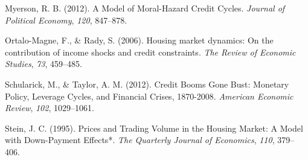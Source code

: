 \documentclass[
  12pt,
]{article}
\newlength{\cslhangindent}
\newlength{\cslentryspacingunit} %
\newenvironment{CSLReferences}[2] %
 {%
  \setlength{\parindent}{0pt}
  \ifodd #1
  \let\oldpar\par
  \def\par{\hangindent=\cslhangindent\oldpar}
  \fi
  \setlength{\parskip}{#2\cslentryspacingunit}
 }%
 {}
\begin{document}
\begin{CSLReferences}{1}{0}
\leavevmode{}%
Myerson, R. B. (2012). A {Model} of {Moral}-{Hazard Credit Cycles}. \emph{Journal of Political Economy}, \emph{120}, 847--878.

\leavevmode{}%
Ortalo-Magne, F., \& Rady, S. (2006). Housing market dynamics: On the contribution of income shocks and credit constraints. \emph{The Review of Economic Studies}, \emph{73}, 459--485.

\leavevmode{}%
Schularick, M., \& Taylor, A. M. (2012). Credit {Booms Gone Bust}: Monetary {Policy}, {Leverage Cycles}, and {Financial Crises}, 1870-2008. \emph{American Economic Review}, \emph{102}, 1029--1061.

\leavevmode{}%
Stein, J. C. (1995). Prices and {Trading Volume} in the {Housing Market}: A {Model} with {Down}-{Payment Effects}*. \emph{The Quarterly Journal of Economics}, \emph{110}, 379--406.

\end{CSLReferences}
\end{document}
